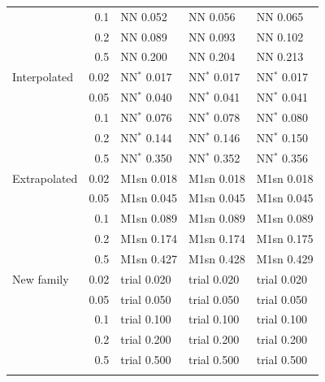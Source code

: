 \documentclass[pdflatex,sn-basic]{sn-jnl}
\begin{document}
\begin{table}[p]
\begin{tabular}{@{}lrlll@{}}
 & 0.1 & NN 0.052 & NN 0.056 & NN 0.065 \\
 & 0.2 & NN 0.089 & NN 0.093 & NN 0.102 \\
 & 0.5 & NN 0.200 & NN 0.204 & NN 0.213 \\
Interpolated & 0.02 & NN$^*$ 0.017 & NN$^*$ 0.017 & NN$^*$ 0.017 \\
 & 0.05 & NN$^*$ 0.040 & NN$^*$ 0.041 & NN$^*$ 0.041 \\
 & 0.1 & NN$^*$ 0.076 & NN$^*$ 0.078 & NN$^*$ 0.080 \\
 & 0.2 & NN$^*$ 0.144 & NN$^*$ 0.146 & NN$^*$ 0.150 \\
 & 0.5 & NN$^*$ 0.350 & NN$^*$ 0.352 & NN$^*$ 0.356 \\
Extrapolated & 0.02 & M1sn 0.018 & M1sn 0.018 & M1sn 0.018 \\
 & 0.05 & M1sn 0.045 & M1sn 0.045 & M1sn 0.045 \\
 & 0.1 & M1sn 0.089 & M1sn 0.089 & M1sn 0.089 \\
 & 0.2 & M1sn 0.174 & M1sn 0.174 & M1sn 0.175 \\
 & 0.5 & M1sn 0.427 & M1sn 0.428 & M1sn 0.429 \\
New family & 0.02 & trial 0.020 & trial 0.020 & trial 0.020 \\
 & 0.05 & trial 0.050 & trial 0.050 & trial 0.050 \\
 & 0.1 & trial 0.100 & trial 0.100 & trial 0.100 \\
 & 0.2 & trial 0.200 & trial 0.200 & trial 0.200 \\
 & 0.5 & trial 0.500 & trial 0.500 & trial 0.500 \\
\botrule
\end{tabular}
\end{table}
\end{document}
